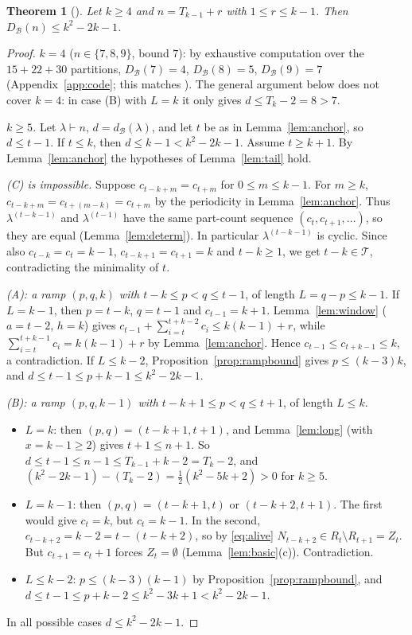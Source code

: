 \documentclass[11pt]{article}
\newtheorem{theorem}{Theorem}[section]
\theoremstyle{definition}
\newcommand{\dB}{d_{\mathcal{B}}}
\newcommand{\DB}{D_{\mathcal{B}}}
\newcommand{\R}{R}
\renewcommand{\le}{\leqslant}
\renewcommand{\ge}{\geqslant}
\begin{document}
\begin{theorem}[{\cite[Thm.~4.4(1)]{GH}}]\label{thm:c3upper}
Let $k\ge4$ and $n=T_{k-1}+r$ with $1\le r\le k-1$.  Then $\DB(n)\le k^2-2k-1$.
\end{theorem}
\begin{proof}
\emph{$k=4$} ($n\in\{7,8,9\}$, bound $7$): by exhaustive computation over the $15+22+30$ partitions,
$\DB(7)=4$, $\DB(8)=5$, $\DB(9)=7$ (Appendix~\ref{app:code}; this matches \cite[Fig.~1]{GH}).
The general argument below does not cover $k=4$: in case (B) with $L=k$ it only gives $d\le T_k-2=8>7$.

\emph{$k\ge5$.}  Let $\lambda\vdash n$, $d=\dB(\lambda)$, and let $t$ be as in Lemma~\ref{lem:anchor}, so $d\le t-1$.  If
$t\le k$, then $d\le k-1<k^2-2k-1$.  Assume $t\ge k+1$.  By Lemma~\ref{lem:anchor} the hypotheses of
Lemma~\ref{lem:tail} hold.

\emph{(C) is impossible.}  Suppose $c_{t-k+m}=c_{t+m}$ for $0\le m\le k-1$.  For $m\ge k$,
$c_{t-k+m}=c_{t+(m-k)}=c_{t+m}$ by the periodicity in Lemma~\ref{lem:anchor}.  Thus $\lambda^{(t-k-1)}$ and
$\lambda^{(t-1)}$ have the same part-count sequence $(c_t,c_{t+1},\dots)$, so they are equal
(Lemma~\ref{lem:determ}).  In particular $\lambda^{(t-k-1)}$ is cyclic.  Since also $c_{t-k}=c_t=k-1$,
$c_{t-k+1}=c_{t+1}=k$ and $t-k\ge1$, we get $t-k\in\mathcal T$, contradicting the minimality of $t$.

\emph{(A): a ramp $(p,q,k)$ with $t-k\le p<q\le t-1$}, of length $L=q-p\le k-1$.
If $L=k-1$, then $p=t-k$, $q=t-1$ and $c_{t-1}=k+1$.  Lemma~\ref{lem:window} ($a=t-2$, $h=k$) gives
$c_{t-1}+\sum_{i=t}^{t+k-2}c_i\le k(k-1)+r$, while $\sum_{i=t}^{t+k-1}c_i=k(k-1)+r$ by Lemma~\ref{lem:anchor}.
Hence $c_{t-1}\le c_{t+k-1}\le k$, a contradiction.  If $L\le k-2$, Proposition~\ref{prop:rampbound} gives
$p\le(k-3)k$, and $d\le t-1\le p+k-1\le k^2-2k-1$.

\emph{(B): a ramp $(p,q,k-1)$ with $t-k+1\le p<q\le t+1$}, of length $L\le k$.
\begin{itemize}
\item $L=k$: then $(p,q)=(t-k+1,t+1)$, and Lemma~\ref{lem:long} (with $x=k-1\ge2$) gives $t+1\le n+1$.  So
$d\le t-1\le n-1\le T_{k-1}+k-2=T_k-2$, and $(k^2-2k-1)-(T_k-2)=\tfrac12(k^2-5k+2)>0$ for $k\ge5$.
\item $L=k-1$: then $(p,q)=(t-k+1,t)$ or $(t-k+2,t+1)$.  The first would give $c_t=k$, but $c_t=k-1$.  In the
second, $c_{t-k+2}=k-2=t-(t-k+2)$, so by \eqref{eq:alive} $N_{t-k+2}\in \R_t\setminus \R_{t+1}=Z_t$.  But
$c_{t+1}=c_t+1$ forces $Z_t=\emptyset$ (Lemma~\ref{lem:basic}(c)).  Contradiction.
\item $L\le k-2$: $p\le(k-3)(k-1)$ by Proposition~\ref{prop:rampbound}, and
$d\le t-1\le p+k-2\le k^2-3k+1<k^2-2k-1$.
\end{itemize}
In all possible cases $d\le k^2-2k-1$.
\end{proof}
\end{document}
